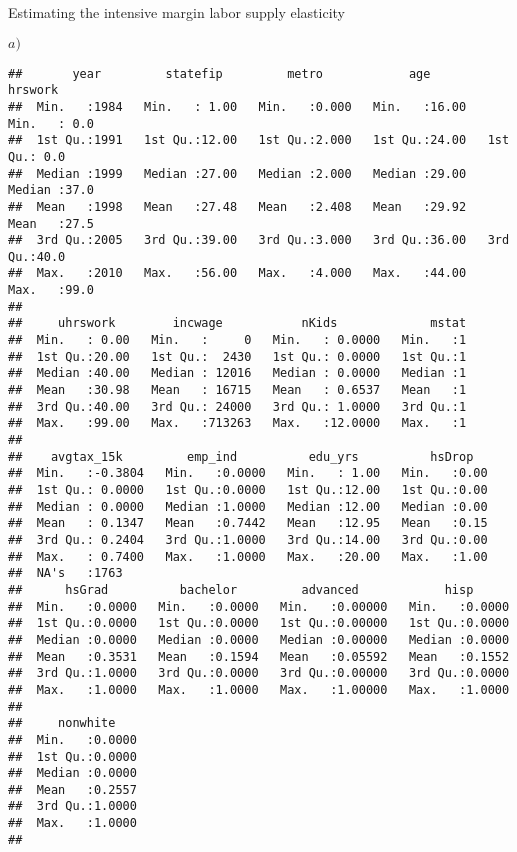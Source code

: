 \documentclass[
  ignorenonframetext,
]{beamer}
\begin{document}
\begin{frame}[fragile]{Estimating the intensive margin labor supply
elasticity}
\begin{block}{\(a)\)}
\begin{verbatim}
##       year         statefip         metro            age           hrswork    
##  Min.   :1984   Min.   : 1.00   Min.   :0.000   Min.   :16.00   Min.   : 0.0  
##  1st Qu.:1991   1st Qu.:12.00   1st Qu.:2.000   1st Qu.:24.00   1st Qu.: 0.0  
##  Median :1999   Median :27.00   Median :2.000   Median :29.00   Median :37.0  
##  Mean   :1998   Mean   :27.48   Mean   :2.408   Mean   :29.92   Mean   :27.5  
##  3rd Qu.:2005   3rd Qu.:39.00   3rd Qu.:3.000   3rd Qu.:36.00   3rd Qu.:40.0  
##  Max.   :2010   Max.   :56.00   Max.   :4.000   Max.   :44.00   Max.   :99.0  
##                                                                               
##     uhrswork        incwage           nKids             mstat  
##  Min.   : 0.00   Min.   :     0   Min.   : 0.0000   Min.   :1  
##  1st Qu.:20.00   1st Qu.:  2430   1st Qu.: 0.0000   1st Qu.:1  
##  Median :40.00   Median : 12016   Median : 0.0000   Median :1  
##  Mean   :30.98   Mean   : 16715   Mean   : 0.6537   Mean   :1  
##  3rd Qu.:40.00   3rd Qu.: 24000   3rd Qu.: 1.0000   3rd Qu.:1  
##  Max.   :99.00   Max.   :713263   Max.   :12.0000   Max.   :1  
##                                                                
##    avgtax_15k         emp_ind          edu_yrs          hsDrop    
##  Min.   :-0.3804   Min.   :0.0000   Min.   : 1.00   Min.   :0.00  
##  1st Qu.: 0.0000   1st Qu.:0.0000   1st Qu.:12.00   1st Qu.:0.00  
##  Median : 0.0000   Median :1.0000   Median :12.00   Median :0.00  
##  Mean   : 0.1347   Mean   :0.7442   Mean   :12.95   Mean   :0.15  
##  3rd Qu.: 0.2404   3rd Qu.:1.0000   3rd Qu.:14.00   3rd Qu.:0.00  
##  Max.   : 0.7400   Max.   :1.0000   Max.   :20.00   Max.   :1.00  
##  NA's   :1763                                                     
##      hsGrad          bachelor         advanced            hisp       
##  Min.   :0.0000   Min.   :0.0000   Min.   :0.00000   Min.   :0.0000  
##  1st Qu.:0.0000   1st Qu.:0.0000   1st Qu.:0.00000   1st Qu.:0.0000  
##  Median :0.0000   Median :0.0000   Median :0.00000   Median :0.0000  
##  Mean   :0.3531   Mean   :0.1594   Mean   :0.05592   Mean   :0.1552  
##  3rd Qu.:1.0000   3rd Qu.:0.0000   3rd Qu.:0.00000   3rd Qu.:0.0000  
##  Max.   :1.0000   Max.   :1.0000   Max.   :1.00000   Max.   :1.0000  
##                                                                      
##     nonwhite     
##  Min.   :0.0000  
##  1st Qu.:0.0000  
##  Median :0.0000  
##  Mean   :0.2557  
##  3rd Qu.:1.0000  
##  Max.   :1.0000  
## 
\end{verbatim}


\end{block}
\end{frame}
\end{document}

